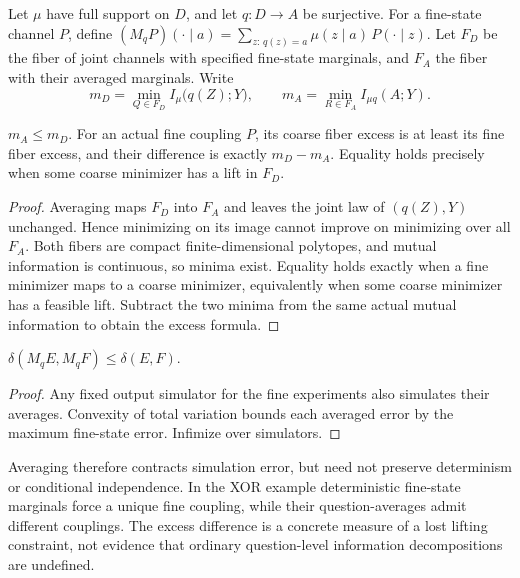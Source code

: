 Let $\mu$ have full support on $D$, and let $q:D\to A$ be surjective. For a fine-state channel $P$, define $(M_qP)(\cdot\mid a)=\sum_{z:\,q(z)=a}\mu(z\mid a)\,P(\cdot\mid z)$. Let $F_D$ be the fiber of joint channels with specified fine-state marginals, and $F_A$ the fiber with their averaged marginals. Write
\[
m_D=\min_{Q\in F_D} I_\mu\bigl(q(Z);Y\bigr),\qquad
m_A=\min_{R\in F_A} I_{\mu q}(A;Y).
\]

\begin{thmplain}
$m_A\le m_D$. For an actual fine coupling $P$, its coarse fiber excess is at least its fine fiber excess, and their difference is exactly $m_D-m_A$. Equality holds precisely when some coarse minimizer has a lift in $F_D$.
\end{thmplain}
\begin{proof}
Averaging maps $F_D$ into $F_A$ and leaves the joint law of $(q(Z),Y)$ unchanged. Hence minimizing on its image cannot improve on minimizing over all $F_A$. Both fibers are compact finite-dimensional polytopes, and mutual information is continuous, so minima exist. Equality holds exactly when a fine minimizer maps to a coarse minimizer, equivalently when some coarse minimizer has a feasible lift. Subtract the two minima from the same actual mutual information to obtain the excess formula.
\end{proof}

\begin{thmplain}
$\delta(M_qE,M_qF)\le\delta(E,F)$.
\end{thmplain}
\begin{proof}
Any fixed output simulator for the fine experiments also simulates their averages. Convexity of total variation bounds each averaged error by the maximum fine-state error. Infimize over simulators.
\end{proof}

Averaging therefore contracts simulation error, but need not preserve determinism or conditional independence. In the XOR example deterministic fine-state marginals force a unique fine coupling, while their question-averages admit different couplings. The excess difference is a concrete measure of a lost lifting constraint, not evidence that ordinary question-level information decompositions are undefined.



